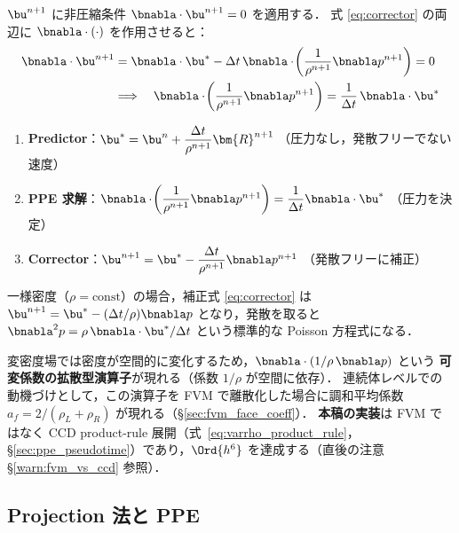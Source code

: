 $\bu^{n+1}$ に非圧縮条件 $\bnabla\cdot\bu^{n+1}=0$ を適用する．
式 \eqref{eq:corrector} の両辺に $\bnabla\cdot(\cdot)$ を作用させると：
\begin{align}
  \bnabla\cdot\bu^{n+1}
  &= \bnabla\cdot\bu^* - \Delta t\,\bnabla\cdot\!\left(\frac{1}{\rho^{n+1}}\bnabla p^{n+1}\right) = 0
  \notag \\
  &\Longrightarrow\quad
  \bnabla\cdot\!\left(\frac{1}{\rho^{n+1}}\bnabla p^{n+1}\right)
  = \frac{1}{\Delta t}\,\bnabla\cdot\bu^*
  \label{eq:PPE_derivation}
\end{align}

\begin{tcolorbox}[mybox, title={変密度 Projection 法の骨格（まとめ）}]
\begin{enumerate}
  \item \textbf{Predictor}：$\bu^* = \bu^n + \dfrac{\Delta t}{\rho^{n+1}}\bm{R}^{n+1}$
        \hfill（圧力なし，発散フリーでない速度）
  \item \textbf{PPE 求解}：$\bnabla\cdot\!\left(\dfrac{1}{\rho^{n+1}}\bnabla p^{n+1}\right) = \dfrac{1}{\Delta t}\bnabla\cdot\bu^*$
        \hfill（圧力を決定）
  \item \textbf{Corrector}：$\bu^{n+1} = \bu^* - \dfrac{\Delta t}{\rho^{n+1}}\bnabla p^{n+1}$
        \hfill（発散フリーに補正）
\end{enumerate}
\end{tcolorbox}

\begin{tcolorbox}[warnbox, title={なぜ $\bnabla\cdot(1/\rho\,\bnabla p)$ の形が出るのか？}]
一様密度（$\rho=\text{const}$）の場合，補正式 \eqref{eq:corrector} は
$\bu^{n+1} = \bu^* - (\Delta t/\rho)\bnabla p$ となり，発散を取ると
$\bnabla^2 p = \rho\,\bnabla\cdot\bu^*/\Delta t$ という標準的な Poisson 方程式になる．

変密度場では密度が空間的に変化するため，$\bnabla\cdot(1/\rho\,\bnabla p)$ という
\textbf{可変係数の拡散型演算子}が現れる（係数 $1/\rho$ が空間に依存）．
連続体レベルでの動機づけとして，この演算子を FVM で離散化した場合に調和平均係数
$a_f = 2/(\rho_L+\rho_R)$ が現れる（§\ref{sec:fvm_face_coeff}）．
\textbf{本稿の実装}は FVM ではなく CCD product-rule 展開（式~\eqref{eq:varrho_product_rule}，
§\ref{sec:ppe_pseudotime}）であり，$\Ord{h^6}$ を達成する（直後の注意 §\ref{warn:fvm_vs_ccd} 参照）．
\end{tcolorbox}

\subsection{Projection 法と PPE}
\label{sec:ppe}

